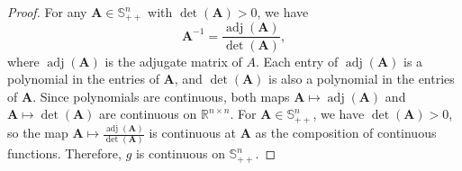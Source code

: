 \documentclass[10pt,a4paper]{amsart}
\newcommand{\R}{\mathbb{R}}
\def\mA{{\bm{A}}}
\begin{document}
\begin{proof}
For any $\mA \in \mathbb{S}_{++}^n$ with $\det(\mA) > 0$, we have
\[
\mA^{-1} = \frac{\operatorname{adj}(\mA)}{\det(\mA)},
\]
where $\operatorname{adj}(\mA)$ is the adjugate matrix of $A$.  Each entry of $\operatorname{adj}(\mA)$ is a polynomial in the entries of $\mA$, and $\det(\mA)$ is also a polynomial in the entries of $\mA$. Since polynomials are continuous, both maps $\mA \mapsto \operatorname{adj}(\mA)$ and $\mA \mapsto \det(\mA)$ are continuous on $\R^{n \times n}$.  For $\mA \in \mathbb{S}_{++}^n$, we have $\det(\mA) > 0$, so the map $\mA \mapsto \frac{\operatorname{adj}(\mA)}{\det(\mA)}$ is continuous at $\mA$ as the composition of continuous functions.  Therefore, $g$ is continuous on $\mathbb{S}_{++}^n$.
\end{proof}
\end{document}
